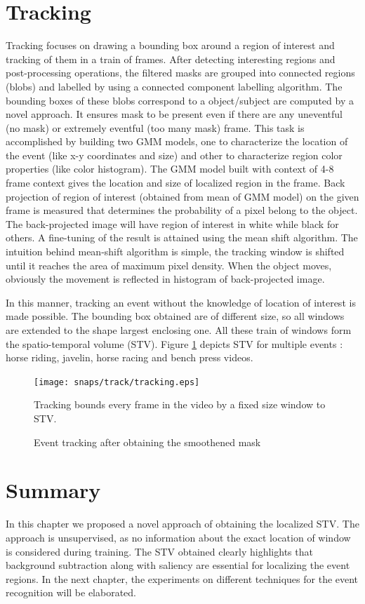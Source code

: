 \section{Tracking}
 \label{sec:trac}
Tracking focuses on drawing a bounding box  around a region of interest and tracking of them in a train of frames. After detecting interesting  regions and  post-processing operations, the filtered masks are grouped into connected regions (blobs) and labelled by using a connected component labelling algorithm. The bounding boxes of these blobs correspond to a object/subject are computed by a novel approach. It ensures mask to be present even if there are any uneventful (no mask) or extremely eventful (too many mask) frame.  This task is accomplished by building two GMM models, one to characterize the location of the event (like x-y coordinates and size) and other to characterize region color properties (like color histogram). The GMM model built with context of 4-8 frame context gives the location and size of localized region in the frame. 
Back projection \citep{backProj} of region of interest (obtained from mean of GMM model) on the given frame is measured that determines the probability of a pixel belong to the object. The back-projected image  will have region of interest in white while black for others. A fine-tuning of the result is attained using the mean shift algorithm.  The intuition behind mean-shift algorithm is simple, the tracking window is shifted until it reaches the area of maximum pixel density. When the object moves, obviously the movement is reflected in histogram of back-projected image. 
\par In this manner, tracking an event  without the knowledge of location of interest is made possible. The bounding box obtained are of different size, so all windows are extended to the shape largest enclosing one. All these train of  windows form the spatio-temporal volume (STV). Figure \ref{fig:tracking} depicts STV for multiple events : horse riding, javelin, horse racing and bench press videos.
\begin{figure}[htpb]
   \begin{center}
	    \texttt{[image: snaps/track/tracking.eps]}     
     \caption {Event tracking after obtaining the smoothened mask}
     \medskip \small 
     Tracking bounds every frame in the video by a fixed size window to STV.
   \label{fig:tracking}
   \end{center}
 \end{figure}
\section{Summary}
In this chapter we proposed a novel approach of obtaining the localized STV. The approach is unsupervised, as no information about the exact location of window is considered during training. The STV obtained clearly highlights that background subtraction along with saliency are essential for localizing the event regions. In the next chapter, the experiments on different techniques for the event recognition will be elaborated.